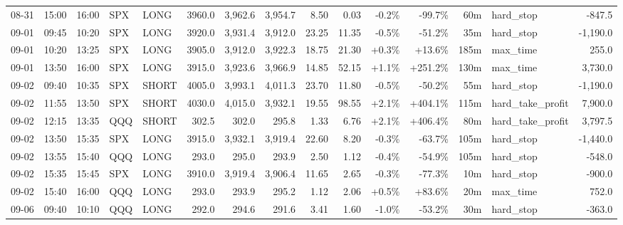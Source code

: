 \documentclass[11pt,a4paper,twoside]{article}
\begin{document}
\begin{landscape}
\begin{center}
\begin{longtable}{>{\color{txtmain}}l l l l l r r r r r r r r >{\color{txtmain}}l r}
08-31 & 15:00 & 16:00 & SPX & LONG & 3960.0 & 3,962.6 & 3,954.7 & 8.50 & 0.03 & \textcolor{lossred}{-0.2\%} & \textcolor{lossred}{-99.7\%} & 60m & hard\_stop & \textcolor{lossred}{-847.5} \\
09-01 & 09:45 & 10:20 & SPX & LONG & 3920.0 & 3,931.4 & 3,912.0 & 23.25 & 11.35 & \textcolor{lossred}{-0.5\%} & \textcolor{lossred}{-51.2\%} & 35m & hard\_stop & \textcolor{lossred}{-1,190.0} \\
09-01 & 10:20 & 13:25 & SPX & LONG & 3905.0 & 3,912.0 & 3,922.3 & 18.75 & 21.30 & \textcolor{wingreen}{+0.3\%} & \textcolor{wingreen}{+13.6\%} & 185m & max\_time & \textcolor{wingreen}{255.0} \\
09-01 & 13:50 & 16:00 & SPX & LONG & 3915.0 & 3,923.6 & 3,966.9 & 14.85 & 52.15 & \textcolor{wingreen}{+1.1\%} & \textcolor{wingreen}{+251.2\%} & 130m & max\_time & \textcolor{wingreen}{3,730.0} \\
09-02 & 09:40 & 10:35 & SPX & SHORT & 4005.0 & 3,993.1 & 4,011.3 & 23.70 & 11.80 & \textcolor{lossred}{-0.5\%} & \textcolor{lossred}{-50.2\%} & 55m & hard\_stop & \textcolor{lossred}{-1,190.0} \\
09-02 & 11:55 & 13:50 & SPX & SHORT & 4030.0 & 4,015.0 & 3,932.1 & 19.55 & 98.55 & \textcolor{wingreen}{+2.1\%} & \textcolor{wingreen}{+404.1\%} & 115m & hard\_take\_profit & \textcolor{wingreen}{7,900.0} \\
09-02 & 12:15 & 13:35 & QQQ & SHORT & 302.5 & 302.0 & 295.8 & 1.33 & 6.76 & \textcolor{wingreen}{+2.1\%} & \textcolor{wingreen}{+406.4\%} & 80m & hard\_take\_profit & \textcolor{wingreen}{3,797.5} \\
09-02 & 13:50 & 15:35 & SPX & LONG & 3915.0 & 3,932.1 & 3,919.4 & 22.60 & 8.20 & \textcolor{lossred}{-0.3\%} & \textcolor{lossred}{-63.7\%} & 105m & hard\_stop & \textcolor{lossred}{-1,440.0} \\
09-02 & 13:55 & 15:40 & QQQ & LONG & 293.0 & 295.0 & 293.9 & 2.50 & 1.12 & \textcolor{lossred}{-0.4\%} & \textcolor{lossred}{-54.9\%} & 105m & hard\_stop & \textcolor{lossred}{-548.0} \\
09-02 & 15:35 & 15:45 & SPX & LONG & 3910.0 & 3,919.4 & 3,906.4 & 11.65 & 2.65 & \textcolor{lossred}{-0.3\%} & \textcolor{lossred}{-77.3\%} & 10m & hard\_stop & \textcolor{lossred}{-900.0} \\
09-02 & 15:40 & 16:00 & QQQ & LONG & 293.0 & 293.9 & 295.2 & 1.12 & 2.06 & \textcolor{wingreen}{+0.5\%} & \textcolor{wingreen}{+83.6\%} & 20m & max\_time & \textcolor{wingreen}{752.0} \\
09-06 & 09:40 & 10:10 & QQQ & LONG & 292.0 & 294.6 & 291.6 & 3.41 & 1.60 & \textcolor{lossred}{-1.0\%} & \textcolor{lossred}{-53.2\%} & 30m & hard\_stop & \textcolor{lossred}{-363.0} \\

\end{longtable}
\end{center}
\end{landscape}
\end{document}

